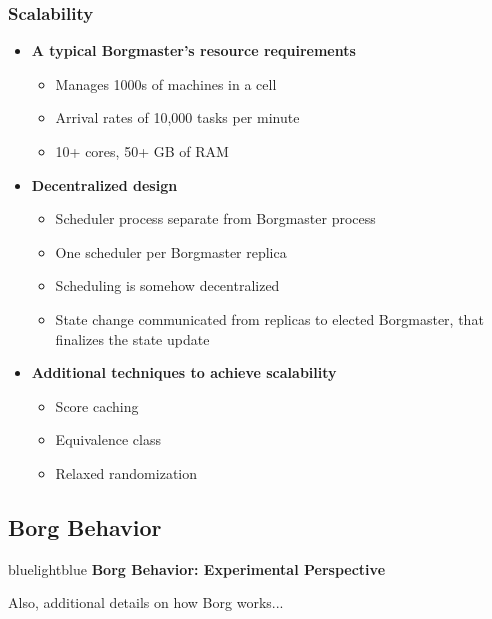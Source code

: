 \begin{frame}
\frametitle{Scalability}
\begin{itemize}
	\item {\bf A typical Borgmaster's resource requirements}
	\begin{itemize}
		\item Manages 1000s of machines in a cell
		\item Arrival rates of 10,000 tasks per minute
		\item 10+ cores, 50+ GB of RAM
	\end{itemize}

\vspace{20pt}

	\item {\bf Decentralized design}
	\begin{itemize}
		\item Scheduler process separate from Borgmaster process
		\item One scheduler per Borgmaster replica
		\item Scheduling is somehow decentralized
		\item State change communicated from replicas to elected Borgmaster, that finalizes the state update
	\end{itemize}

\vspace{20pt}

	\item {\bf Additional techniques to achieve scalability}
	\begin{itemize}
		\item Score caching
		\item Equivalence class
		\item Relaxed randomization
	\end{itemize}
\end{itemize}
\end{frame}

\subsection{Borg Behavior}
\begin{frame}
 \begin{colorblock}{blue}{lightblue}{ }
    {\Large \textbf{Borg Behavior: Experimental Perspective}}

    Also, additional details on how Borg works...
  \end{colorblock}
\end{frame}

